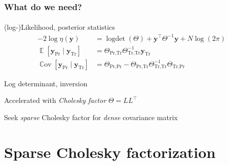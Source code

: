\documentclass{beamer}                             %
\newcommand*{\defeq}{\coloneqq}
\renewcommand*{\vec}[1]{\bm{#1}}
\newcommand*{\CM}{\Theta}
\newcommand*{\PM}{Q}
\newcommand*{\Train}{\text{Tr}}
\newcommand*{\Pred}{\text{Pr}}
\DeclareMathOperator{\logdet}{logdet}
\DeclareMathOperator{\E}{\mathbb{E}}
\DeclareMathOperator{\Var}{\mathbb{V}ar}
\DeclareMathOperator{\Cov}{\mathbb{C}ov}
\DeclareMathOperator{\Corr}{\mathbb{C}orr}
\newenvironment{wideitemize}
  {\itemize\setlength{\itemsep}{0.5cm}}
  {\enditemize}
\begin{document}
\begin{frame}
\frametitle{What do we need?}
\framesubtitle{}

\begin{wideitemize}
  \item<+-> (log-)Likelihood, posterior statistics
    \begin{align*}
      -2 \log \eta(\vec{y}) &=
        \logdet(\CM)
        + \vec{y}^{\top} \CM^{-1} \vec{y}
        + N \log(2 \pi) \\
      \E[\vec{y}_\Pred \mid \vec{y}_\Train] &=
        \CM_{\Pred, \Train} \CM_{\Train, \Train}^{-1} \vec{y}_\Train \\
      \Cov[\vec{y}_\Pred \mid \vec{y}_\Train] &=
        \CM_{\Pred, \Pred} -
        \CM_{\Pred, \Train} \CM_{\Train, \Train}^{-1}
        \CM_{\Train, \Pred}
    \end{align*}
  \item<+-> Log determinant, inversion
  \item<+-> Accelerated with \emph{Cholesky factor} \( \CM = L L^{\top} \)
  \item<+-> Seek \emph{sparse} Cholesky
    factor for \emph{dense} covariance matrix
\end{wideitemize}
\end{frame}

\section{Sparse Cholesky factorization}

%
\end{document}
